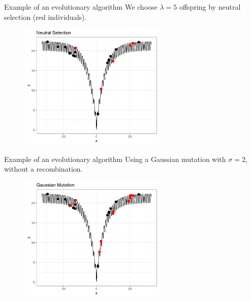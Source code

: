 \documentclass[11pt,compress,t,notes=noshow, xcolor=table]{beamer}
\begin{document}
\begin{vbframe}{Example of an evolutionary algorithm}
We choose $\lambda = 5$ offspring by neutral selection (red individuals).

\vspace{0.5cm}

\begin{center}
\begin{figure}
  \includegraphics[height = 6cm, width = 7cm]{figure_man/neutral-selec.png}
\end{figure}
\end{center}

\end{vbframe}


\begin{vbframe}{Example of an evolutionary algorithm}
Using a Gaussian mutation with $\sigma=2$, without a recombination.
\vspace{0.5cm}

\begin{center}
\begin{figure}
  \includegraphics[height = 6cm, width = 7cm]{figure_man/gaussian-mutation.png}
\end{figure}
\end{center}

\end{vbframe}
\end{document}
